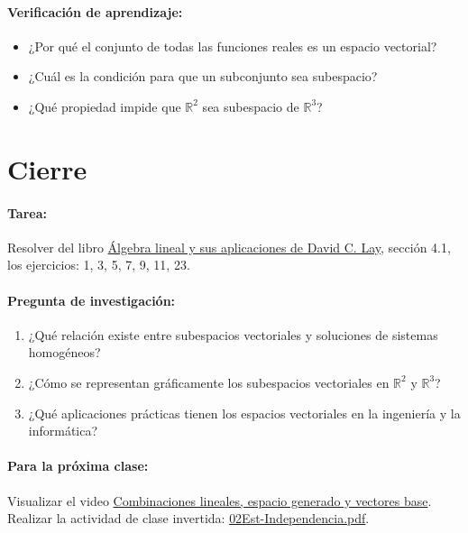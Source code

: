 \documentclass[a4,11pt]{aleph-notas}
\begin{document}
\paragraph{Verificación de aprendizaje:}
\begin{itemize}
\item ¿Por qué el conjunto de todas las funciones reales es un espacio vectorial?
\item ¿Cuál es la condición para que un subconjunto sea subespacio?
\item ¿Qué propiedad impide que $\mathbb{R}^2$ sea subespacio de $\mathbb{R}^3$?
\end{itemize}

\section*{Cierre}

\paragraph{Tarea:}
Resolver del libro \href{https://catalogobiblioteca.puce.edu.ec/cgi-bin/koha/opac-detail.pl?biblionumber=86083}{Álgebra lineal y sus aplicaciones de David C. Lay}, sección 4.1, los ejercicios: 1, 3, 5, 7, 9, 11, 23.

\paragraph{Pregunta de investigación:}
\begin{enumerate}[leftmargin=*]
\item ¿Qué relación existe entre subespacios vectoriales y soluciones de sistemas homogéneos?
\item ¿Cómo se representan gráficamente los subespacios vectoriales en $\mathbb{R}^2$ y $\mathbb{R}^3$?
\item ¿Qué aplicaciones prácticas tienen los espacios vectoriales en la ingeniería y la informática?
\end{enumerate}

\paragraph{Para la próxima clase:}
Visualizar el video \href{https://www.youtube.com/watch?v=k7RM-ot2NWY\&list=PLZHQObOWTQDPD3MizzM2xVFitgF8hE\_ab\&index=2}{Combinaciones lineales, espacio generado y vectores base}.
Realizar la actividad de clase invertida: \href{https://fcena-puce.github.io/AlgLinealyGeomAnalitica-05-N0068/2-ClaseInvertida/02Est-Independencia.pdf}{02Est-Independencia.pdf}.
\end{document}
